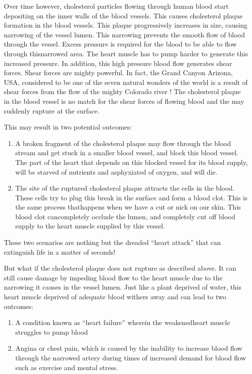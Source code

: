 Over time however, chole\-sterol particles flowing through human blood start depositing on the inner walls of the blood vessels. This causes choleste\-rol plaque formation in the blood vessels. This plaque progressively increases in size, causing narrowing of the vessel lumen. This narro\-wing prevents the smooth flow of blood through the vessel. Excess pressure is required for the blood to be able to flow through this\break narrowed area. The heart muscle has to pump harder to generate this increased pressure. In addition, this high pressure blood flow gene\-rates shear forces. Shear forces are mighty powerful. In fact, the Grand Canyon Arizona, USA, considered to be one of the seven natural wonders of the world is a result of shear forces from the flow of the mighty Colorado river ! The cholesterol plaque in the blood vessel is no match for the shear forces of flowing blood and the may suddenly rupture at the surface.

\noindent This may result in two potential outcomes:

\begin{enumerate}
\itemsep=0pt
\item A broken fragment of the choleste\-rol plaque may flow through the blood stream and get stuck in a smaller blood vessel, and block this blood vessel. The part of the heart that depends on this blocked vessel for its blood supply, will be starved of nutrients and asphyxiated of oxygen, and will die.
\item The site of the ruptured cholesterol plaque attracts the cells in the blood. These cells try to plug this break in the surface and form a blood clot. This is the same process that\break happens when we have a cut or nick on our skin. This blood clot can\break completely occlude the lumen, and completely cut off blood supply to the heart muscle supplied by this vessel.
\end{enumerate}

\clearpage
These two scenarios are nothing but the dreaded “heart attack” that can extinguish life in a matter of seconds!

But what if the cholesterol plaque does not rupture as described above. It can still cause damage by impeding blood flow to the heart muscle due to the narrowing it causes in the vessel lumen. Just like a plant deprived of water, this heart muscle deprived of adequate blood withers away and can lead to two outcomes:
\begin{enumerate}
\itemsep=0pt
\item A condition known as “heart failure” wherein the weakened\break heart muscle struggles to pump blood
\item Angina or chest pain, which is caused by the inability to increase blood flow through the narrowed artery during times of increa\-sed demand for blood flow such as exercise and mental stress.
\end{enumerate}

